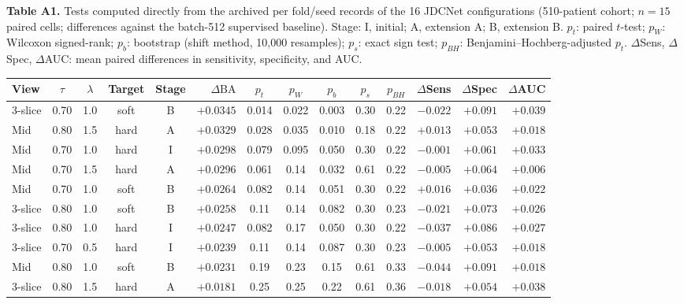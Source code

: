 \documentclass[pdflatex,sn-vancouver,Numbered]{sn-jnl}
\begin{document}
\begin{minipage}{\textwidth}
{\small\noindent\textbf{Table A1.} Tests computed directly from the archived per fold/seed records of the 16 JDCNet configurations (510-patient cohort; $n{=}15$ paired cells; differences against the batch-512 supervised baseline). Stage: I, initial; A, extension A; B, extension B. $p_t$: paired $t$-test; $p_W$: Wilcoxon signed-rank; $p_b$: bootstrap (shift method, 10{,}000 resamples); $p_s$: exact sign test; $p_{BH}$: Benjamini--Hochberg-adjusted $p_t$. $\Delta$Sens, $\Delta$Spec, $\Delta$AUC: mean paired differences in sensitivity, specificity, and AUC.\par}
\vspace{6pt}


\centering
\scriptsize
\setlength{\tabcolsep}{1.1pt}
\renewcommand{\arraystretch}{0.9}
\begin{tabular*}{\textwidth}{@{\extracolsep{\fill}}lccccrcccccrrr@{}}
\toprule
View & $\tau$ & $\lambda$ & Target & Stage & $\Delta\mathrm{BA}$ & $p_t$ & $p_W$ & $p_b$ & $p_s$ & $p_{BH}$ & $\Delta$Sens & $\Delta$Spec & $\Delta$AUC \\
\midrule
3-slice & 0.70 & 1.0 & soft & B & $+0.0345$ & 0.014 & 0.022 & 0.003 & 0.30 & 0.22 & $-0.022$ & $+0.091$ & $+0.039$ \\
Mid & 0.80 & 1.5 & hard & A & $+0.0329$ & 0.028 & 0.035 & 0.010 & 0.18 & 0.22 & $+0.013$ & $+0.053$ & $+0.018$ \\
Mid & 0.70 & 1.0 & hard & I & $+0.0298$ & 0.079 & 0.095 & 0.050 & 0.30 & 0.22 & $-0.001$ & $+0.061$ & $+0.033$ \\
Mid & 0.70 & 1.5 & hard & A & $+0.0296$ & 0.061 & 0.14 & 0.032 & 0.61 & 0.22 & $-0.005$ & $+0.064$ & $+0.006$ \\
Mid & 0.70 & 1.0 & soft & B & $+0.0264$ & 0.082 & 0.14 & 0.051 & 0.30 & 0.22 & $+0.016$ & $+0.036$ & $+0.022$ \\
3-slice & 0.80 & 1.0 & soft & B & $+0.0258$ & 0.11 & 0.14 & 0.082 & 0.30 & 0.23 & $-0.021$ & $+0.073$ & $+0.026$ \\
3-slice & 0.80 & 1.0 & hard & I & $+0.0247$ & 0.082 & 0.17 & 0.050 & 0.30 & 0.22 & $-0.037$ & $+0.086$ & $+0.027$ \\
3-slice & 0.70 & 0.5 & hard & I & $+0.0239$ & 0.11 & 0.14 & 0.087 & 0.30 & 0.23 & $-0.005$ & $+0.053$ & $+0.018$ \\
Mid & 0.80 & 1.0 & soft & B & $+0.0231$ & 0.19 & 0.23 & 0.15 & 0.61 & 0.33 & $-0.044$ & $+0.091$ & $+0.018$ \\
3-slice & 0.80 & 1.5 & hard & A & $+0.0181$ & 0.25 & 0.25 & 0.22 & 0.61 & 0.36 & $-0.018$ & $+0.054$ & $+0.038$ \\

\end{tabular*}
\end{minipage}
\end{document}
